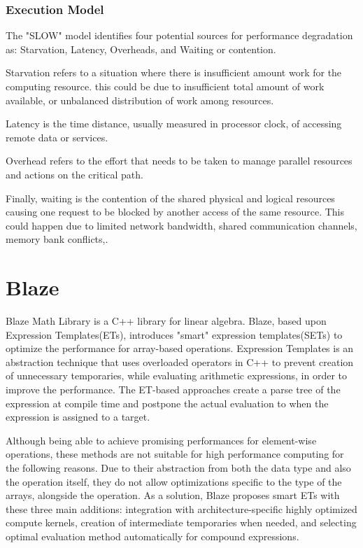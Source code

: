 \vspace{\baselineskip}
\subsubsection{Execution Model}
The "SLOW" model identifies four potential sources for performance degradation as: Starvation, Latency, Overheads, and Waiting or contention\cite{kaiser2009parallex}.

Starvation refers to a situation where there is insufficient amount work for the computing resource. this could be due to insufficient total amount of work available, or unbalanced distribution of work among resources\cite{kulkarni2019comparative}. 

Latency is the time distance, usually measured in processor clock, of accessing remote data or services\cite{gao2007parallex}.  

Overhead refers to the effort that needs to be taken to manage parallel resources and actions on the critical path\cite{kulkarni2019comparative}.

Finally, waiting is the contention of the shared physical and logical resources causing one request to be blocked by another access of the same resource\cite{gao2007parallex}. This could happen due to limited network bandwidth, shared communication channels, memory bank conflicts\cite{kulkarni2019comparative},\cite{gao2007parallex}. 


\vspace{\baselineskip}
\section{Blaze}
Blaze Math Library\cite{iglberger2012expression} is a C++ library for linear algebra. Blaze, based upon Expression Templates(ETs)\cite{veldhuizen1995expression}, introduces "smart" expression templates(SETs)\cite{iglberger2012expression} to optimize the performance for array-based operations. Expression Templates\cite{veldhuizen1995expression} is an abstraction technique that uses overloaded operators in C++ to prevent creation of unnecessary temporaries, while evaluating arithmetic expressions, in order to improve the performance\cite{iglberger2012expression}. The ET-based approaches create a parse tree of the expression at compile time and postpone the actual evaluation to when the expression is assigned to a target. 

Although being able to achieve promising performances for element-wise operations, these methods are not suitable for high performance computing for the following reasons. Due to their abstraction from both the data type and also the operation itself, they do not allow optimizations specific to the type of the arrays, alongside the operation\cite{iglberger2012expression}. As a solution, Blaze proposes smart ETs with these three main additions: integration with architecture-specific highly optimized compute kernels, creation of intermediate temporaries when needed, and selecting optimal evaluation method automatically for compound expressions\cite{iglberger2012expression}. 

